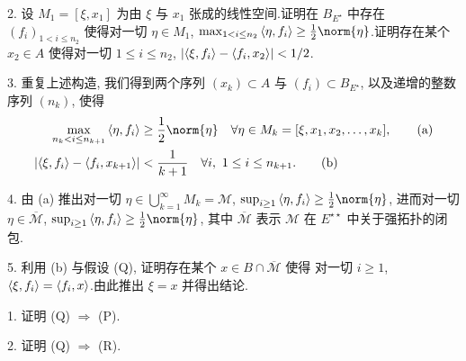 \begin{problem}
2. 设 $M_1=[\xi,x_1]$ 为由 $\xi$ 与 $x_1$ 张成的线性空间.证明在 $B_{E^\star}$
中存在 $(f_i)_{1<i\le n_2}$ 使得对一切 $\eta\in M_1$,
$\max_{1<i\le n_2}\dual{\eta}{f_i}\ge\frac12\norm{\eta}$.证明存在某个
$x_2\in A$ 使得对一切 $1\le i\le n_2$, $\left|\left\langle \xi,f_i\right\rangle-\left\langle f_i,x_2\right\rangle\right|<1/2$.

3. 重复上述构造, 我们得到两个序列 $(x_k)\subset A$ 与 $(f_i)\subset B_{E^\star}$,
以及递增的整数序列 $(n_k)$, 使得
\begin{align*}
\max_{n_k<i\le n_{k+1}}\dual{\eta}{f_i}&\ge\frac12\norm{\eta}\quad\forall\eta\in M_k=[\xi,x_1,x_2,\dots,x_k], \tag{a}\\
\abs{\dual{\xi}{f_i}-\dual{f_i}{x_{k+1}}}&<\frac{1}{k+1}\quad\forall i,\ 1\le i\le n_{k+1}. \tag{b}
\end{align*}

4. 由 (a) 推出对一切 $\eta\in\bigcup_{k=1}^\infty M_k=\mathcal{M}$,
$\sup_{i\ge1}\dual{\eta}{f_i}\ge\frac12\norm{\eta}$, 进而对一切 $\eta\in\overline{\mathcal{M}}$,
$\sup_{i\ge1}\dual{\eta}{f_i}\ge\frac12\norm{\eta}$, 其中 $\overline{\mathcal{M}}$
表示 $\mathcal{M}$ 在 $E^{\star\star}$ 中关于强拓扑的闭包.

5. 利用 (b) 与假设 (Q), 证明存在某个 $x\in B\cap\overline{\mathcal{M}}$ 使得
对一切 $i\ge1$, $\left\langle \xi,f_i\right\rangle=\left\langle f_i,x\right\rangle$.由此推出 $\xi=x$ 并得出结论.


1. 证明 (Q) $\Rightarrow$ (P).

2. 证明 (Q) $\Rightarrow$ (R).
\end{problem}
